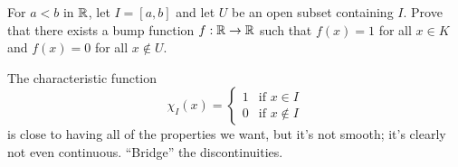 \begin{exercise} \label{constant-compact-zero-outside-neighborhood}
	For $a < b$ in $\mathbb{R}$, let $I = [a, b]$ and let $U$ be an open subset containing $I$. Prove that there exists a bump function $f : \mathbb{R} \to \mathbb{R}$ such that $f(x) = 1$ for all $x \in K$ and $f(x) = 0$ for all $x \notin U$. \begin{hint} 
	The characteristic function \[ \chi_I(x) = \begin{cases} 1 & \text{if } x \in I \\ 0 & \text{if } x \notin I \end{cases} \]
	is close to having all of the properties we want, but it's not smooth; it's clearly not even continuous. ``Bridge'' the discontinuities. \end{hint}
\end{exercise}

